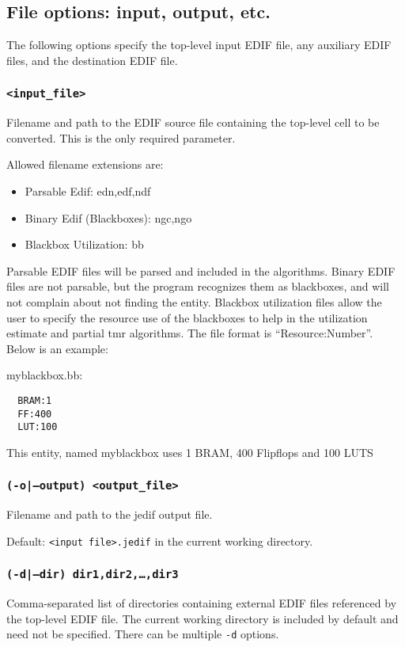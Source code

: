 \subsection{File options: input, output, etc.}
The following options specify the top-level input EDIF file, any auxiliary EDIF
files, and the destination EDIF file.

\subsubsection{\texttt{<input\_file>}}
Filename and path to the EDIF source file containing the top-level cell to be 
converted. This is the only required parameter.

Allowed filename extensions are:
\begin{itemize}
  \item Parsable Edif: edn,edf,ndf
  \item Binary Edif (Blackboxes): ngc,ngo
  \item Blackbox Utilization: bb
\end{itemize}

Parsable EDIF files will be parsed and included in the algorithms.
Binary EDIF files are not parsable, but the program recognizes them as
blackboxes, and will not complain about not finding the entity.
Blackbox utilization files allow the user to specify the resource use
of the blackboxes to help in the utilization estimate and partial tmr
algorithms.  The file format is ``Resource:Number''.  Below is an
example:

myblackbox.bb:\\
\begin{verbatim}
  BRAM:1
  FF:400
  LUT:100
\end{verbatim}

This entity, named myblackbox uses 1 BRAM, 400 Flipflops and 100 LUTS

\subsubsection{\texttt{(-o|--output) <output\_file>}}
Filename and path to the jedif output file.

Default: \texttt{<input file>.jedif} in the current working directory.

\subsubsection{\texttt{(-d|--dir) dir1,dir2,\ldots,dir3}}
Comma-separated list of directories containing external EDIF files referenced 
by the top-level EDIF file. The current working directory is included by 
default and need not be specified. There can be multiple \texttt{-d} options.

